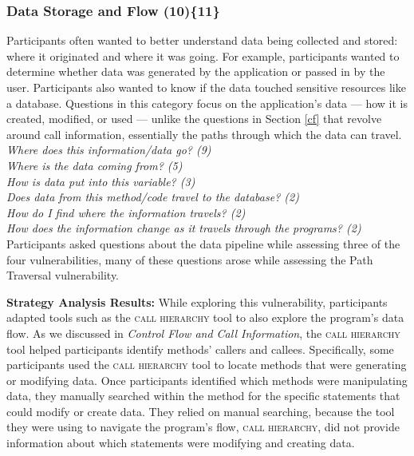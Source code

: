 \documentclass[10pt,journal,compsoc]{IEEEtran}
\begin{document}
%	
%


\subsubsection{Data Storage and Flow (10)\{11\}}\label{dsf}

Participants often wanted to better understand data being collected and stored: where it originated and where it was going. 
For example, participants wanted to determine whether data was generated by the application or passed in by the user. 
Participants also wanted to know if the data touched sensitive resources like a database.
Questions in this category focus on the application's data --- how it is created, modified, or used --- unlike the questions in Section \ref{cf} that revolve around call information, essentially the paths through which the data can travel.
\\

\noindent\emph{Where does this information/data go? (9)} \\
\emph{Where is the data coming from? (5)} \\
\emph{How is data put into this variable? (3)} \\
\emph{Does data from this method/code travel to the database? (2)} \\
\emph{How do I find where the information travels? (2)} \\
\emph{How does the information change as it travels through the programs? (2)} 
\\

 
Participants asked questions about the data pipeline while assessing three of the four vulnerabilities, many of these questions arose while assessing the Path Traversal vulnerability. 


\textbf{Strategy Analysis Results:}
While exploring this vulnerability, participants adapted tools such as the \textsc{call hierarchy} tool to also explore the program's data flow. 
As we discussed in \emph{Control Flow and Call Information}, the \textsc{call hierarchy} tool helped participants identify methods' callers and callees.
Specifically, some participants used the \textsc{call hierarchy} tool to locate methods that were generating or modifying data.
Once participants identified which methods were manipulating data, they manually searched within the method for the specific statements that could modify or create data.
They relied on manual searching, because the tool they were using to navigate the program's flow, \textsc{call hierarchy}, did not provide information about which statements were modifying and creating data.
\end{document}
